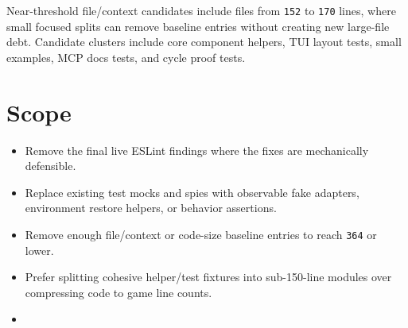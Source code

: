Near-threshold file/context candidates include files from \texttt{1\allowbreak{}5\allowbreak{}2} to \texttt{1\allowbreak{}7\allowbreak{}0} lines, where small focused splits can remove baseline entries without creating new large-file debt. Candidate clusters include core component helpers, TUI layout tests, small examples, MCP docs tests, and cycle proof tests.

\section{Scope}\label{record-242-scope}

\begin{itemize}
\tightlist
\item
  Remove the final live ESLint findings where the fixes are mechanically defensible.
\item
  Replace existing test mocks and spies with observable fake adapters, environment restore helpers, or behavior assertions.
\item
  Remove enough file/context or code-size baseline entries to reach \texttt{3\allowbreak{}6\allowbreak{}4} or lower.
\item
  Prefer splitting cohesive helper/test fixtures into sub-150-line modules over compressing code to game line counts.
\item

\end{itemize}
